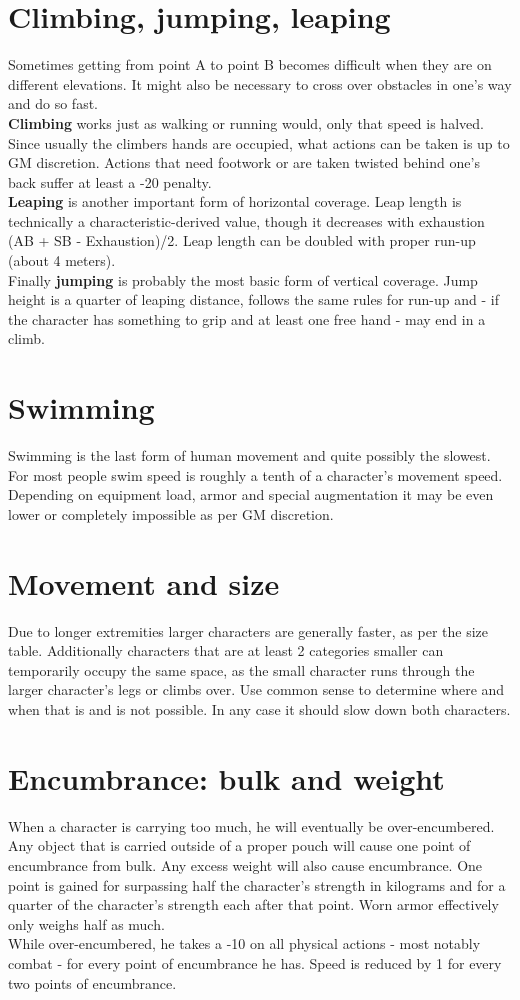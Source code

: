 \documentclass[12pt,a4paper,openany]{book}
\begin{document}
	\section{Climbing, jumping, leaping}
	Sometimes getting from point A to point B becomes difficult when they are on different elevations. It might also be necessary to cross over obstacles in one’s way and do so fast.\\
	\textbf{Climbing} works just as walking or running would, only that speed is halved. Since usually the climbers hands are occupied, what actions can be taken is up to GM discretion. Actions that need footwork or are taken twisted behind one’s back suffer at least a -20 penalty.\\
	\textbf{Leaping} is another important form of horizontal coverage. Leap length is technically a characteristic-derived value, though it decreases with exhaustion (AB + SB - Exhaustion)/2. Leap length can be doubled with proper run-up (about 4 meters).\\
	Finally \textbf{jumping} is probably the most basic form of vertical coverage. Jump height is a quarter of leaping distance, follows the same rules for run-up and - if the character has something to grip and at least one free hand - may end in a climb.
	\section{Swimming}
	Swimming is the last form of human movement and quite possibly the slowest. For most people swim speed is roughly a tenth of a character’s movement speed. Depending on equipment load, armor and special augmentation it may be even lower or completely impossible as per GM discretion.
	\section{Movement and size}
	Due to longer extremities larger characters are generally faster, as per the size table. Additionally characters that are at least 2 categories smaller can temporarily occupy the same space, as the small character runs through the larger character’s legs or climbs over. Use common sense to determine where and when that is and is not possible. In any case it should slow down both characters.
	\section{Encumbrance: bulk and weight}
	When a character is carrying too much, he will eventually be over-encumbered. Any object that is carried outside of a proper pouch will cause one point of encumbrance from bulk.
	Any excess weight will also cause encumbrance. One point is gained for surpassing half the character’s strength in kilograms and for a quarter of the character’s strength each after that point. Worn armor effectively only weighs half as much.\\
	While over-encumbered, he takes a -10 on all physical actions - most notably combat - for every point of encumbrance he has. Speed is reduced by 1 for every two points of encumbrance.
	
\end{document}
